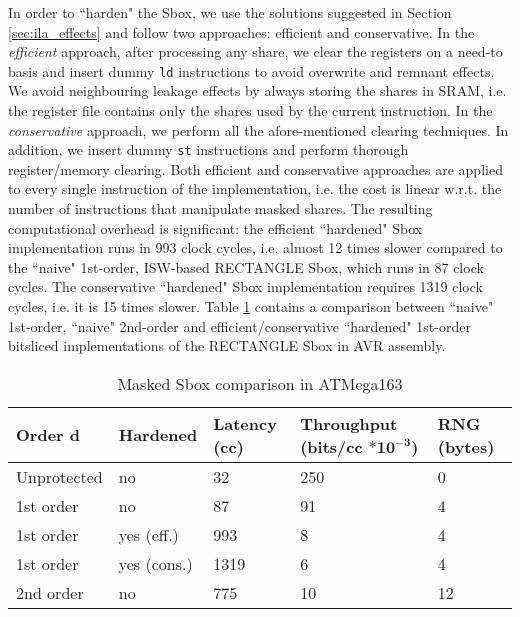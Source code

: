 In order to ``harden" the Sbox, we use the solutions suggested in Section \ref{sec:ila_effects} and follow two approaches: efficient and conservative. In the \emph{efficient} approach, after processing any share, we clear the registers on a need-to basis and insert dummy \texttt{ld} instructions to avoid overwrite and remnant effects. We avoid neighbouring leakage effects by always storing the shares in SRAM, i.e. the register file contains only the shares used by the current instruction. In the \emph{conservative} approach, we perform all the afore-mentioned clearing techniques. In addition, we insert dummy \texttt{st} instructions and perform thorough register/memory clearing. Both efficient and conservative approaches are applied to every single instruction of the implementation, i.e. the cost is linear w.r.t. the number of instructions that manipulate masked shares. The resulting computational overhead is significant: the efficient ``hardened" Sbox implementation runs in 993 clock cycles, i.e. almost 12 times slower compared to the ``naive" 1st-order, ISW-based RECTANGLE Sbox, which runs in $87$ clock cycles. The conservative ``hardened" Sbox implementation requires 1319 clock cycles, i.e. it is 15 times slower. Table \ref{cc_table} contains a comparison between ``naive" 1st-order, ``naive" 2nd-order and efficient/conservative ``hardened" 1st-order bitsliced implementations of the RECTANGLE Sbox in AVR assembly.
\begin{table}[H]
\centering
\caption{Masked Sbox comparison in ATMega163}
\label{cc_table}
\begin{tabular}{ |l|l|l|l|l|}
\hline
\textbf{Order $\mathbf{d}$} & \textbf{Hardened} & \textbf{Latency (cc) }& \pbox{20cm}{ \textbf{Throughput} \\ \textbf{(bits/cc $\mathbf{*10^{-3}}$)} }& \textbf{RNG (bytes)} \\ \hline \hline 
Unprotected  & no & 32 & 250 & 0 \\ \hline
1st order      &   no & 87 & 91 &  4\\ \hline
 1st order      &   yes (eff.)& 993 & 8 & 4\\ \hline
 1st order      &   yes (cons.) & 1319 & 6 & 4\\ \hline
 2nd order     &   no  & 775 & 10 & 12\\ \hline
\end{tabular}
\end{table}

